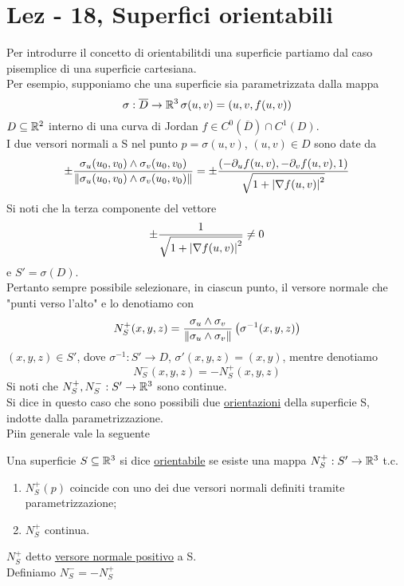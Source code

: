 \section{Lez - 18, Superfici orientabili}
Per introdurre il concetto di orientabilit\aca di una superficie
partiamo dal caso pi\acu semplice di una superficie cartesiana. \\
Per esempio, supponiamo che una superficie sia parametrizzata dalla mappa 
$$\sigma:\overline{D}\to\mathbb{R}^3 \, \sigma(u,v)=(u,v,f(u,v))$$
$D\subseteq \mathbb{R}^2$ interno di una curva di Jordan $f \in C^0(\overline{D})\cap C^1(D)$. \\
I due versori normali a S nel punto $p = \sigma(u,v)$, $(u,v)\in D$ sono date da 
$$\pm \frac{\sigma_u(u_0,v_0)\wedge\sigma_v(u_0,v_0)}
{\left\lVert\sigma_u(u_0,v_0)\wedge \sigma_v(u_0,v_0)\right\rVert} = \pm \frac{\left(-\partial_u f(u,v), -\partial_v f(u,v), 1\right)}
    {\sqrt{1+\left\lvert \nabla f(u,v) \right\rvert^2}}$$
Si noti che la terza componente del vettore 
$$\pm \frac{1}{\sqrt{1+\left\lvert \nabla f(u,v) \right\rvert^2}} \neq 0$$
e $S' = \sigma(D)$. \\
Pertanto \ace sempre possibile selezionare, in ciascun punto, il versore normale che 
"punti verso l'alto" e lo denotiamo con 
$$N_S^{+} (x,y,z) = \frac{\sigma_u\wedge \sigma_v}{\left\lVert\sigma_u\wedge\sigma_v\right\rVert}\left(\sigma^{-1}(x,y,z)\right)$$
$(x,y,z)\in S'$, dove $\sigma^{-1}:S'\to D$, $\sigma'(x,y,z) = (x,y)$, mentre 
denotiamo 
$$N_S^{-} (x,y,z) = - N_S^{+} (x,y,z)$$
Si noti che $N_S^{+}, N_S^{-}: S' \to \mathbb{R}^3$ sono continue. \\
Si dice in questo caso che sono possibili due \underline{orientazioni} della superficie S, indotte
dalla parametrizzazione. \\
Pi\acu in generale vale la seguente
\begin{definition}
  Una superficie $S\subseteq\mathbb{R}^3$ si dice \underline{orientabile} se esiste una mappa 
  $N_S^{+} : S'\to\mathbb{R}^3$ t.c. 
  \begin{enumerate}
    \item $N_S^{+}(p)$ coincide con uno dei due versori normali definiti tramite parametrizzazione;
    \item $N_S^{+}$ \ace continua.  
  \end{enumerate}
  $N_S^{+}$ \ace detto \underline{versore normale positivo} a S. \\
  Definiamo $N_S^{-} = - N_S^{+}$
\end{definition} 

